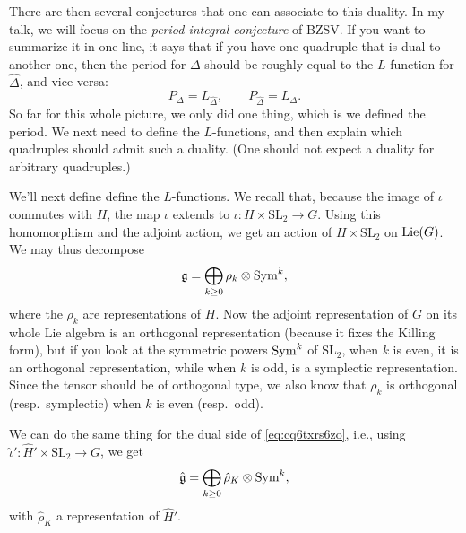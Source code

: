 \documentclass[reqno]{amsart} 
\numberwithin{theorem}{section}
\numberwithin{equation}{section}
\numberwithin{exercise}{section}
\begin{document}
There are then several conjectures that one can associate to this duality.  In my talk, we will focus on the \emph{period integral conjecture} of BZSV.  If you want to summarize it in one line, it says that if you have one quadruple that is dual to another one, then the period for $\Delta$ should be roughly equal to the $L$-function for $\hat{\Delta}$, and vice-versa:
\begin{equation*}
  P_{\Delta} = L_{\hat{\Delta}}, \qquad
  P_{\hat{\Delta}} = L_{\Delta}.
\end{equation*}
So far for this whole picture, we only did one thing, which is we defined the period.  We next need to define the $L$-functions, and then explain which quadruples should admit such a duality.  (One should not expect a duality for arbitrary quadruples.)

We'll next define define the $L$-functions.  We recall that, because the image of $\iota$ commutes with $H$, the map $\iota$ extends to $\iota : H \times \mathrm{SL}_2 \rightarrow G$.  Using this homomorphism and the adjoint action, we get an action of $H \times \mathrm{SL}_2$ on $\operatorname{Lie}(G)$.  We may thus decompose
\begin{equation*}
  \mathfrak{g} = \bigoplus_{k \geq 0} \rho_k \otimes \operatorname{Sym}^k,
\end{equation*}
where the $\rho_k$ are representations of $H$.  Now the adjoint representation of $G$ on its whole Lie algebra is an orthogonal representation (because it fixes the Killing form), but if you look at the symmetric powers $\operatorname{Sym}^k$ of $\mathrm{SL}_2$, when $k$ is even, it is an orthogonal representation, while when $k$ is odd, is a symplectic representation.  Since the tensor should be of orthogonal type, we also know that $\rho_k$ is orthogonal (resp.\ symplectic) when $k$ is even (resp.\ odd).

We can do the same thing for the dual side of \eqref{eq:cq6txrs6zo}, i.e., using $\hat{\iota} ' : \hat{H} ' \times \mathrm{SL}_2 \rightarrow G$, we get
\begin{equation*}
  \hat{\mathfrak{g}} = \bigoplus_{k \geq 0}
  \hat{\rho}_K \otimes \operatorname{Sym}^k,
\end{equation*}
with $\hat{\rho}_K$ a representation of $\hat{H}'$.
\end{document}
